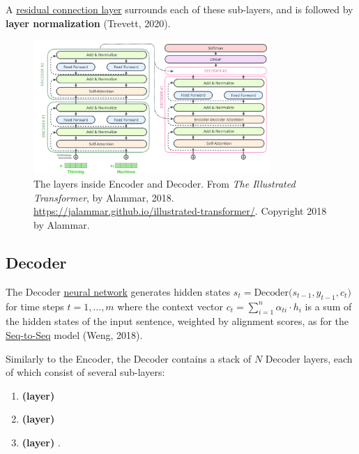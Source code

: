 A \hyperref[sec:ResidualConnections]{residual connection layer} surrounds each of these sub-layers, and is followed by \textbf{layer normalization} (Trevett, 2020).  




\begin{figure}[h]
\vspace{-10pt}
\centering
\includegraphics[width=0.8\textwidth]{imgs/encoderDecoderLayersDetailed.png}
\vspace{-10pt}
\caption{\footnotesize The layers inside Encoder and Decoder. From \emph{The Illustrated Transformer}, by Alammar, 2018. \url{https://jalammar.github.io/illustrated-transformer/}. Copyright 2018 by Alammar.}
\vspace{-5pt}
\label{fig:encDecLayersDetailed}
\end{figure}




\subsection{Decoder} \label{sec:TransformerDecoder}


The Decoder \hyperref[sec:NeuralLM]{neural network} generates hidden states $s_t = \text{Decoder}\Big( s_{t-1}, y_{t-1}, c_t \Big)$ for time steps $t = 1,..., m$ where the context vector $c_t = \sum_{i=1}^n \alpha_{ti} \cdot h_i$ is a sum of the hidden states of the input sentence, weighted by alignment scores, as for the \hyperref[sec:Seq2Seq]{Seq-to-Seq} model (Weng, 2018). 

Similarly to the Encoder, the Decoder contains a stack of $N$ Decoder layers, each of which consist of several sub-layers:
\begin{enumerate}
    \item \textbf{  (layer)}
    \item \textbf{  (layer)} 
    \item \textbf{  (layer) }. 
\end{enumerate}

